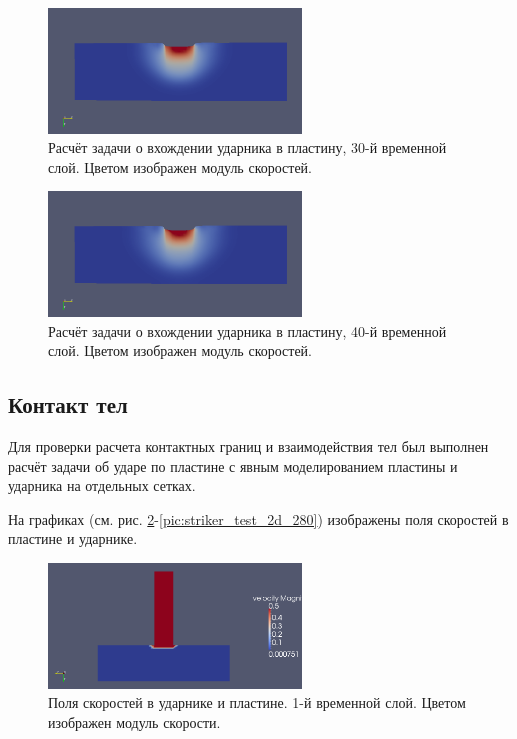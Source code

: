 \begin{figure}[htp]
\centering
\includegraphics[width=0.6\textwidth]{png/border-test/v-2d/0030.png}
\caption{Расчёт задачи о вхождении ударника в пластину, 30-й временной слой. Цветом изображен модуль скоростей.}
\end{figure}

\begin{figure}[htp]
\centering
\includegraphics[width=0.6\textwidth]{png/border-test/v-2d/0040.png}
\caption{Расчёт задачи о вхождении ударника в пластину, 40-й временной слой. Цветом изображен модуль скоростей.}
\label{pic:moving_border_40}
\end{figure}


\clearpage
\newpage

\subsection{Контакт тел}
Для проверки расчета контактных границ и взаимодействия тел был выполнен расчёт задачи об ударе по пластине с явным моделированием пластины и ударника на отдельных сетках.

На графиках (см. рис. \ref{pic:striker_test_2d_1}-\ref{pic:striker_test_2d_280}) изображены поля скоростей в пластине и ударнике.

\begin{figure}[htp]
\centering
\includegraphics[width=0.6\textwidth]{png/strike-test/both-2d/0001.png}
\caption{Поля скоростей в ударнике и пластине. 1-й временной слой. Цветом изображен модуль скорости.}
\label{pic:striker_test_2d_1}
\end{figure}

